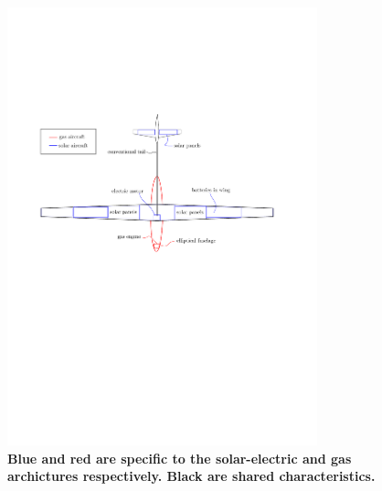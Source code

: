 \begin{figure}[H]
	\begin{center}
	\includegraphics[width=0.8\textwidth,natwidth=517,natheight=408]{simpleaircraft.pdf}
    \caption{\textbf{Blue and red are specific to the solar-electric and gas archictures respectively.  Black are shared characteristics.}}
	\label{f:simpleaircraft}
	\end{center}
\end{figure}

